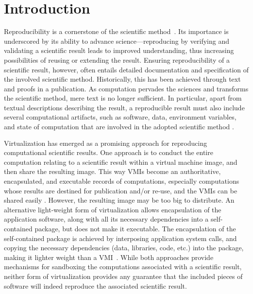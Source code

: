 \section{Introduction}

Reproducibility is a cornerstone of the scientific method~\cite{borgman2012data}. 
Its importance is underscored by its ability to advance science---reproducing by verifying and validating a scientific result leads to improved understanding, thus increasing possibilities of reusing or extending the result. 
Ensuring reproducibility of a scientific result, however, often entails detailed documentation and specification of the involved scientific method. Historically, this has been achieved through text and proofs in a publication. 
As computation pervades the sciences and transforms the scientific method, mere text is no longer sufficient. 
In particular, apart from textual descriptions describing the result, a reproducible result must also include several computational artifacts, such as software, data,  environment variables, and state of computation that are involved in the adopted scientific method \cite{Sole}.  

Virtualization has emerged as a promising approach for reproducing computational scientific results. One approach is to conduct the entire computation relating to a scientific result within a virtual machine image, and then share the resulting image. This way VMIs become an authoritative, encapsulated, and executable records of computations, especially computations whose results are destined for publication and/or re-use, and the VMIs can be shared easily \cite{Lampoudi}. 
However, the resulting image may be too big to distribute. An alternative light-weight form of virtualization allows encapsulation of the application software, along with all its necessary dependencies into a self-contained package, but does not make it executable.
The encapsulation of the self-contained package is achieved by interposing application system calls, and copying the necessary dependencies (data, libraries, code, etc.) into the package, making it lighter weight than a VMI~\cite{guo2011cde}. While both approaches provide mechanisms for sandboxing the computations associated with a scientific result, neither form of virtualization provides any guarantee that the included pieces of software will indeed reproduce the associated scientific result. 


